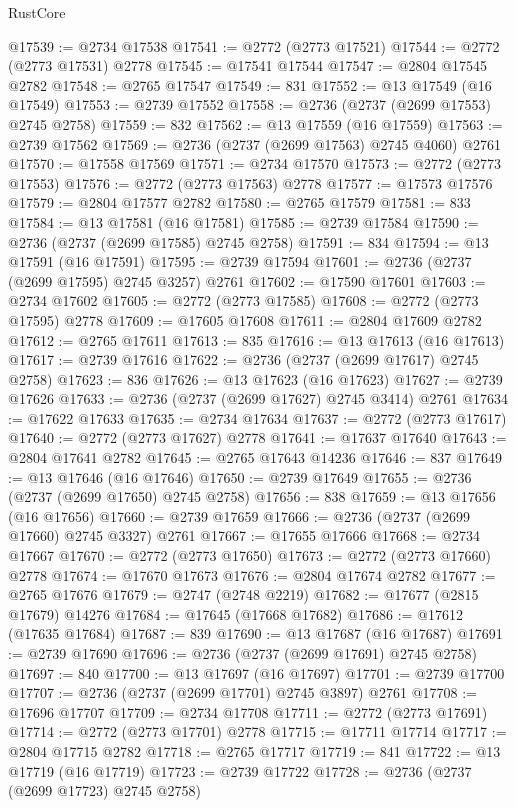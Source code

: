 \begin{lexlean}{RustCore}
\begin{coremodule}
@17539 := @2734 @17538
@17541 := @2772 (@2773 @17521)
@17544 := @2772 (@2773 @17531) @2778
@17545 := @17541 @17544
@17547 := @2804 @17545 @2782
@17548 := @2765 @17547
@17549 := 831
@17552 := @13 @17549 (@16 @17549)
@17553 := @2739 @17552
@17558 := @2736 (@2737 (@2699 @17553) @2745 @2758)
@17559 := 832
@17562 := @13 @17559 (@16 @17559)
@17563 := @2739 @17562
@17569 := @2736 (@2737 (@2699 @17563) @2745 @4060) @2761
@17570 := @17558 @17569
@17571 := @2734 @17570
@17573 := @2772 (@2773 @17553)
@17576 := @2772 (@2773 @17563) @2778
@17577 := @17573 @17576
@17579 := @2804 @17577 @2782
@17580 := @2765 @17579
@17581 := 833
@17584 := @13 @17581 (@16 @17581)
@17585 := @2739 @17584
@17590 := @2736 (@2737 (@2699 @17585) @2745 @2758)
@17591 := 834
@17594 := @13 @17591 (@16 @17591)
@17595 := @2739 @17594
@17601 := @2736 (@2737 (@2699 @17595) @2745 @3257) @2761
@17602 := @17590 @17601
@17603 := @2734 @17602
@17605 := @2772 (@2773 @17585)
@17608 := @2772 (@2773 @17595) @2778
@17609 := @17605 @17608
@17611 := @2804 @17609 @2782
@17612 := @2765 @17611
@17613 := 835
@17616 := @13 @17613 (@16 @17613)
@17617 := @2739 @17616
@17622 := @2736 (@2737 (@2699 @17617) @2745 @2758)
@17623 := 836
@17626 := @13 @17623 (@16 @17623)
@17627 := @2739 @17626
@17633 := @2736 (@2737 (@2699 @17627) @2745 @3414) @2761
@17634 := @17622 @17633
@17635 := @2734 @17634
@17637 := @2772 (@2773 @17617)
@17640 := @2772 (@2773 @17627) @2778
@17641 := @17637 @17640
@17643 := @2804 @17641 @2782
@17645 := @2765 @17643 @14236
@17646 := 837
@17649 := @13 @17646 (@16 @17646)
@17650 := @2739 @17649
@17655 := @2736 (@2737 (@2699 @17650) @2745 @2758)
@17656 := 838
@17659 := @13 @17656 (@16 @17656)
@17660 := @2739 @17659
@17666 := @2736 (@2737 (@2699 @17660) @2745 @3327) @2761
@17667 := @17655 @17666
@17668 := @2734 @17667
@17670 := @2772 (@2773 @17650)
@17673 := @2772 (@2773 @17660) @2778
@17674 := @17670 @17673
@17676 := @2804 @17674 @2782
@17677 := @2765 @17676
@17679 := @2747 (@2748 @2219)
@17682 := @17677 (@2815 @17679) @14276
@17684 := @17645 (@17668 @17682)
@17686 := @17612 (@17635 @17684)
@17687 := 839
@17690 := @13 @17687 (@16 @17687)
@17691 := @2739 @17690
@17696 := @2736 (@2737 (@2699 @17691) @2745 @2758)
@17697 := 840
@17700 := @13 @17697 (@16 @17697)
@17701 := @2739 @17700
@17707 := @2736 (@2737 (@2699 @17701) @2745 @3897) @2761
@17708 := @17696 @17707
@17709 := @2734 @17708
@17711 := @2772 (@2773 @17691)
@17714 := @2772 (@2773 @17701) @2778
@17715 := @17711 @17714
@17717 := @2804 @17715 @2782
@17718 := @2765 @17717
@17719 := 841
@17722 := @13 @17719 (@16 @17719)
@17723 := @2739 @17722
@17728 := @2736 (@2737 (@2699 @17723) @2745 @2758)

\end{coremodule}
\end{lexlean}
